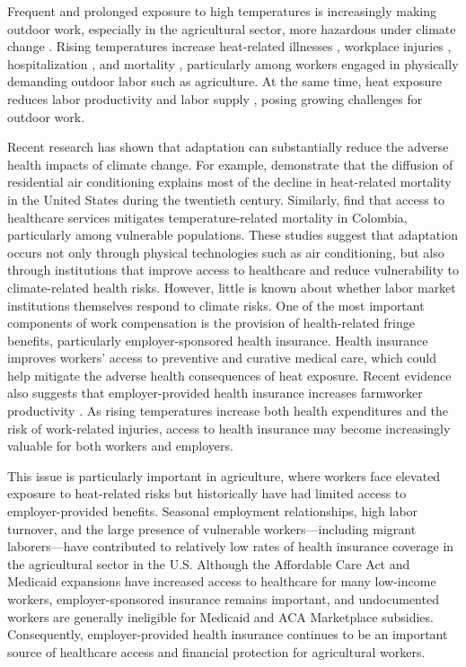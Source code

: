 \documentclass[12pt]{article}
\begin{document}
Frequent and prolonged exposure to high temperatures is increasingly making outdoor work, especially in the agricultural sector, more hazardous under climate change \citep{ipcc_climate_2023}. Rising temperatures increase heat-related illnesses \citep{faurie_association_2022}, workplace injuries \citep{dillender_climate_2021, deschenes_climate_2011, park_temperature_2021}, hospitalization \citep{white_dynamic_2017, gould_temperature_2025, aguilar-gomez_hot_2025}, and mortality \citep{deschenes_climate_2011}, particularly among workers engaged in physically demanding outdoor labor such as agriculture. At the same time, heat exposure reduces labor productivity and labor supply \citep{graff_zivin_temperature_2014, somanathan_impact_2021, colmer_temperature_2021}, posing growing challenges for outdoor work.

Recent research has shown that adaptation can substantially reduce the adverse health impacts of climate change. For example, \citet{barreca_adapting_2016} demonstrate that the diffusion of residential air conditioning explains most of the decline in heat-related mortality in the United States during the twentieth century. Similarly, \citet{helo_sarmiento_into_2023} find that access to healthcare services mitigates temperature-related mortality in Colombia, particularly among vulnerable populations. These studies suggest that adaptation occurs not only through physical technologies such as air conditioning, but also through institutions that improve access to healthcare and reduce vulnerability to climate-related health risks. However, little is known about whether labor market institutions themselves respond to climate risks. One of the most important components of work compensation is the provision of health-related fringe benefits, particularly employer-sponsored health insurance. Health insurance improves workers’ access to preventive and curative medical care, which could help mitigate the adverse health consequences of heat exposure. Recent evidence also suggests that employer-provided health insurance increases farmworker productivity \citep{rutledge_health_2026}. As rising temperatures increase both health expenditures and the risk of work-related injuries, access to health insurance may become increasingly valuable for both workers and employers.


This issue is particularly important in agriculture, where workers face elevated exposure to heat-related risks but historically have had limited access to employer-provided benefits. Seasonal employment relationships, high labor turnover, and the large presence of vulnerable workers—including migrant laborers—have contributed to relatively low rates of health insurance coverage in the agricultural sector in the U.S. Although the Affordable Care Act and Medicaid expansions have increased access to healthcare for many low-income workers, employer-sponsored insurance remains important, and undocumented workers are generally ineligible for Medicaid and ACA Marketplace subsidies. Consequently, employer-provided health insurance continues to be an important source of healthcare access and financial protection for agricultural workers.
\end{document}
